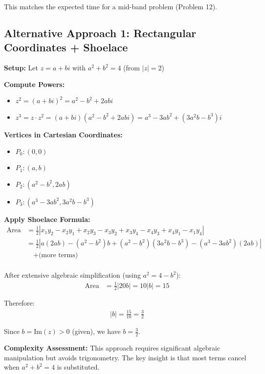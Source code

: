 \documentclass[12pt]{article}
\begin{document}
\begin{solutionbox}
This matches the expected time for a mid-band problem (Problem 12).

\subsection*{Alternative Approach 1: Rectangular Coordinates + Shoelace}

\textbf{Setup:} Let $z = a + bi$ with $a^2 + b^2 = 4$ (from $|z| = 2$)

\textbf{Compute Powers:}
\begin{itemize}
    \item $z^2 = (a + bi)^2 = a^2 - b^2 + 2abi$
    \item $z^3 = z \cdot z^2 = (a+bi)(a^2-b^2+2abi) = a^3 - 3ab^2 + (3a^2b - b^3)i$
\end{itemize}

\textbf{Vertices in Cartesian Coordinates:}
\begin{itemize}
    \item $P_0: (0, 0)$
    \item $P_1: (a, b)$
    \item $P_2: (a^2 - b^2, 2ab)$
    \item $P_3: (a^3 - 3ab^2, 3a^2b - b^3)$
\end{itemize}

\textbf{Apply Shoelace Formula:}
\begin{align*}
\text{Area} &= \frac{1}{2}|x_1y_2 - x_2y_1 + x_2y_3 - x_3y_2 + x_3y_4 - x_4y_3 + x_4y_1 - x_1y_4| \\
&= \frac{1}{2}|a(2ab) - (a^2-b^2)b + (a^2-b^2)(3a^2b-b^3) - (a^3-3ab^2)(2ab)| \\
&\quad + \text{(more terms)} \\
\end{align*}

After extensive algebraic simplification (using $a^2 = 4 - b^2$):
\begin{align*}
\text{Area} &= \frac{1}{2}|20b| = 10|b| = 15
\end{align*}

Therefore:
\begin{align*}
|b| = \frac{15}{10} = \frac{3}{2}
\end{align*}

Since $b = \text{Im}(z) > 0$ (given), we have $b = \frac{3}{2}$.

\textbf{Complexity Assessment:} This approach requires significant algebraic manipulation but avoids trigonometry. The key insight is that most terms cancel when $a^2 + b^2 = 4$ is substituted.


\end{solutionbox}
\end{document}
